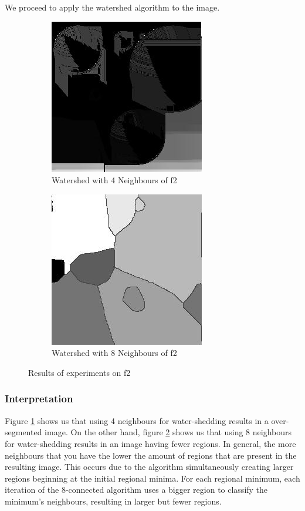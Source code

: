 \documentclass{article}
\begin{document}
\begin{flushleft}
We proceed to apply the watershed algorithm to the image. 
\end{flushleft}
\begin{figure}[ht]
\centering
\begin{subfigure}{.5\textwidth}
  \centering
  \includegraphics[scale=.6]{experiments/f1_f2/4_f2_segmented.jpg}
  \caption{Watershed with 4 Neighbours of f2}
  \label{fig:f2_1}
\end{subfigure}%
\begin{subfigure}{.5\textwidth}
  \centering
  \includegraphics[scale=.6]{experiments/f1_f2/8_f2_segmented.jpg}
  \caption{Watershed with 8 Neighbours of f2}
  \label{fig:f2_2}
\end{subfigure}
\caption{Results of experiments on f2}
\label{fig:f2_ex}
\end{figure}
\subsubsection{Interpretation}
\begin{flushleft}
Figure \ref{fig:f2_1} shows us that using 4 neighbours for water-shedding results in a over-segmented image. On the other hand, figure \ref{fig:f2_2} shows us that using 8 neighbours for water-shedding results in an image having fewer regions.
In general, the more neighbours that you have the lower the amount of regions that are present in the resulting image. This occurs due to the algorithm simultaneously creating larger regions beginning at the initial regional minima. For each regional minimum, each iteration of the 8-connected algorithm uses a bigger region to classify the minimum's neighbours, resulting in larger but fewer regions. 

\end{flushleft}
\end{document}
